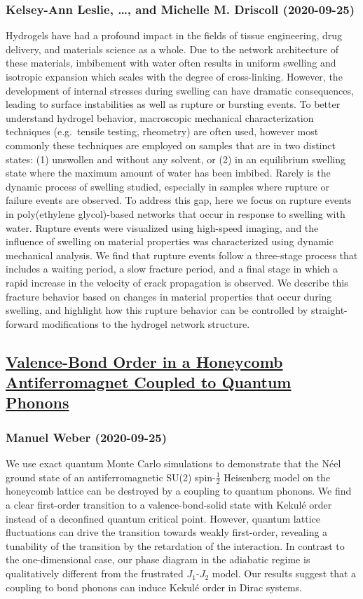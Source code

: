 \subsubsection*{Kelsey-Ann Leslie, \dots, and Michelle M. Driscoll (2020-09-25)}
Hydrogels have had a profound impact in the fields of tissue engineering,
drug delivery, and materials science as a whole. Due to the network
architecture of these materials, imbibement with water often results in uniform
swelling and isotropic expansion which scales with the degree of cross-linking.
However, the development of internal stresses during swelling can have dramatic
consequences, leading to surface instabilities as well as rupture or bursting
events. To better understand hydrogel behavior, macroscopic mechanical
characterization techniques (e.g.\ tensile testing, rheometry) are often used,
however most commonly these techniques are employed on samples that are in two
distinct states: (1) unswollen and without any solvent, or (2) in an
equilibrium swelling state where the maximum amount of water has been imbibed.
Rarely is the dynamic process of swelling studied, especially in samples where
rupture or failure events are observed. To address this gap, here we focus on
rupture events in poly(ethylene glycol)-based networks that occur in response
to swelling with water. Rupture events were visualized using high-speed
imaging, and the influence of swelling on material properties was characterized
using dynamic mechanical analysis. We find that rupture events follow a
three-stage process that includes a waiting period, a slow fracture period, and
a final stage in which a rapid increase in the velocity of crack propagation is
observed. We describe this fracture behavior based on changes in material
properties that occur during swelling, and highlight how this rupture behavior
can be controlled by straight-forward modifications to the hydrogel network
structure.

\subsection*{\href{http://arxiv.org/abs/2009.12393v1}{Valence-Bond Order in a Honeycomb Antiferromagnet Coupled to Quantum  Phonons}}
\subsubsection*{Manuel Weber (2020-09-25)}
We use exact quantum Monte Carlo simulations to demonstrate that the N\'eel
ground state of an antiferromagnetic SU(2) spin-$\frac{1}{2}$ Heisenberg model
on the honeycomb lattice can be destroyed by a coupling to quantum phonons. We
find a clear first-order transition to a valence-bond-solid state with Kekul\'e
order instead of a deconfined quantum critical point. However, quantum lattice
fluctuations can drive the transition towards weakly first-order, revealing a
tunability of the transition by the retardation of the interaction. In contrast
to the one-dimensional case, our phase diagram in the adiabatic regime is
qualitatively different from the frustrated $J_1$-$J_2$ model. Our results
suggest that a coupling to bond phonons can induce Kekul\'e order in Dirac
systems.

